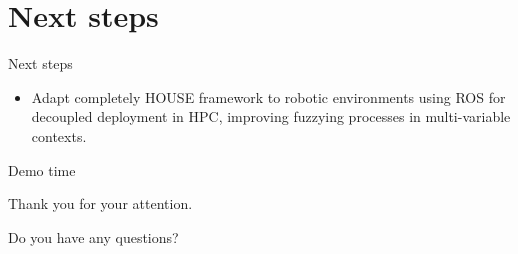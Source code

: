 \documentclass[aspectratio=169]{beamer}
\begin{document}
\section{Next steps}
\begin{frame}{Next steps}
\begin{itemize}
    \item
Adapt completely HOUSE framework to robotic environments using ROS for decoupled deployment in HPC, improving fuzzying processes in multi-variable contexts.
\end{itemize}
\end{frame}




\begin{frame}
\begin{center}
{\centering\Huge\textcolor{black!50}{Demo time}\par}%
\end{center}
    
\end{frame}


\begin{frame}
\begin{center}
{\centering\Huge\textcolor{black!50}{Thank you for your attention.}\par Do you have any questions?}%
\end{center}
    
\end{frame}


%
%
%    
%    
%
\end{document}
